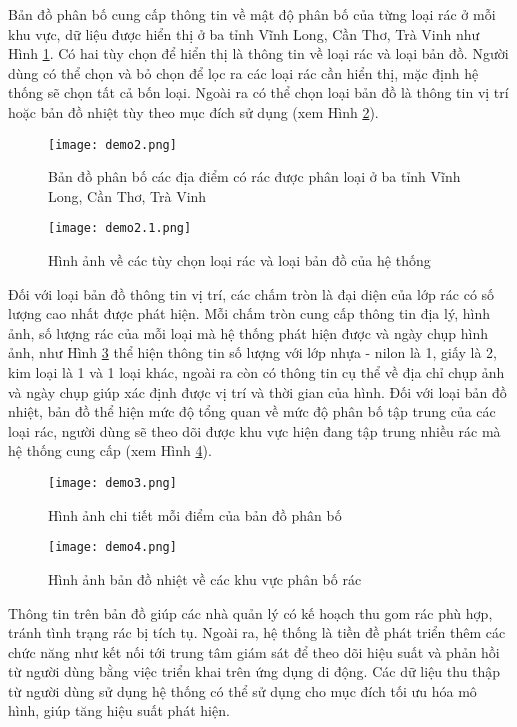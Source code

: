 \documentclass[../the.tex]{subfiles}
\begin{document}
{\fontsize{13}{12} \selectfont 

Bản đồ phân bố cung cấp thông tin về mật độ phân bố của từng loại rác ở mỗi khu vực, dữ liệu được hiển thị ở ba tỉnh Vĩnh Long, Cần Thơ, Trà Vinh như Hình \ref{fig:demo2}. 
Có hai tùy chọn để hiển thị là thông tin về loại rác và loại bản đồ. Người dùng có thể chọn và bỏ chọn để lọc ra các loại rác cần hiển thị, mặc định hệ thống sẽ chọn tất cả bốn loại. 
Ngoài ra có thể chọn loại bản đồ là thông tin vị trí hoặc bản đồ nhiệt tùy theo mục đích sử dụng (xem Hình \ref{fig:demo2.1}).

}

\begin{figure}[H]
    \centering
    \texttt{[image: demo2.png]}
    \caption{Bản đồ phân bố các địa điểm có rác được phân loại ở ba tỉnh Vĩnh Long, Cần Thơ, Trà Vinh}
    \label{fig:demo2}
\end{figure}


\begin{figure}[H]
    \centering
    \texttt{[image: demo2.1.png]}
    \caption{Hình ảnh về các tùy chọn loại rác và loại bản đồ của hệ thống}
    \label{fig:demo2.1}
\end{figure}

{\fontsize{13}{12} \selectfont 

Đối với loại bản đồ thông tin vị trí, các chấm tròn là đại diện của lớp rác có số lượng cao nhất được phát hiện. Mỗi chấm tròn cung cấp thông tin địa lý, hình ảnh, số lượng rác của mỗi loại mà hệ thống phát hiện được và ngày chụp hình ảnh, 
như Hình \ref{fig:demo3} thể hiện thông tin số lượng với lớp nhựa - nilon là 1, giấy là 2, kim loại là 1 và 1 loại khác, ngoài ra còn có thông tin cụ thể về địa chỉ chụp ảnh và ngày chụp giúp xác định được vị trí và thời gian của hình.
Đối với loại bản đồ nhiệt, bản đồ thể hiện mức độ tổng quan về mức độ phân bố tập trung của các loại rác, người dùng sẽ theo dõi được khu vực hiện đang tập trung nhiều rác mà hệ thống cung cấp (xem Hình \ref{fig:demo4}).

}

\begin{figure}[H]
    \centering
    \texttt{[image: demo3.png]}
    \caption{Hình ảnh chi tiết mỗi điểm của bản đồ phân bố}
    \label{fig:demo3}
\end{figure}


\begin{figure}[H]
    \centering
    \texttt{[image: demo4.png]}
    \caption{Hình ảnh bản đồ nhiệt về các khu vực phân bố rác}
    \label{fig:demo4}
\end{figure}

{\fontsize{13}{12} \selectfont 
Thông tin trên bản đồ giúp các nhà quản lý có kế hoạch thu gom rác phù hợp, tránh tình trạng rác bị tích tụ. 
Ngoài ra, hệ thống là tiền đề phát triển thêm các chức năng như kết nối tới trung tâm giám sát để theo dõi hiệu suất và phản hồi từ người dùng bằng việc triển khai trên ứng dụng di động.
Các dữ liệu thu thập từ người dùng sử dụng hệ thống có thể sử dụng cho mục đích tối ưu hóa mô hình, giúp tăng hiệu suất phát hiện. 

}
\end{document}
